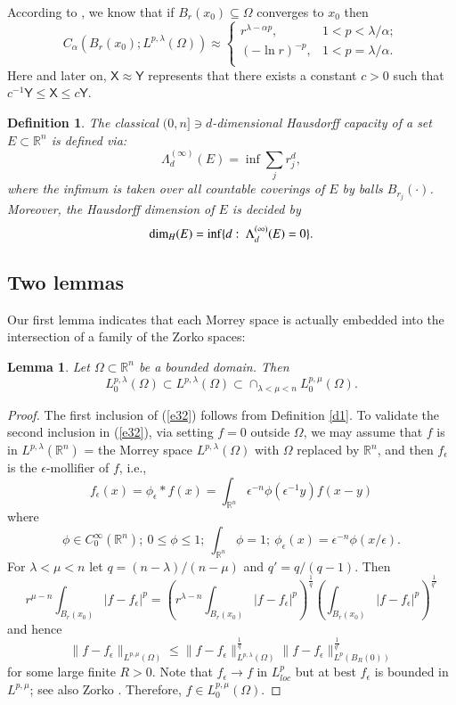 \documentclass[12pt]{amsart}
\newtheorem{definition}[theorem]{Definition}
\newtheorem{lemma}[theorem]{Lemma}
\begin{document}
According to \cite[Theorem 5.3]{AX2004}, we know that if $B_r(x_0)\subseteq\Omega$ converges to $x_0$ then
$$
C_\alpha(B_r(x_0);L^{p,\lambda}(\Omega))\approx\begin{cases}
                              r^{\lambda-\alpha p},  &   1<p<\lambda/\alpha; \\
                              (-\ln r)^{-p},  &   1<p=\lambda/\alpha. \\
                          \end{cases}
$$
Here and later on, ${\mathsf X}\approx{\mathsf Y}$ represents that there exists a constant
$c>0$ such that $c^{-1}{\mathsf Y}\le{\mathsf X}\le c{\mathsf Y}$.

\begin{definition}\label{d3} The classical $(0,n]\ni d$-dimensional Hausdorff capacity of a set $E\subset\mathbb R^n$ is defined via:
$$
\Lambda_d^{(\infty)}(E)=\inf\sum_j r_j^d,
$$
where the infimum is taken over all countable coverings of $E$ by balls $B_{r_j}(\cdot)$. Moreover, the
Hausdorff dimension of $E$ is decided by
$$
\hbox{dim}_H(E)=\inf\{d:\ \Lambda_d^{(\infty)}(E)=0\}.
$$
\end{definition}

\subsection{Two lemmas} Our first lemma indicates that each Morrey space is actually
embedded into the intersection of a family of the Zorko spaces:
\begin{lemma}\label{l1} Let $\Omega\subset\mathbb R^n$ be a bounded domain. Then
\begin{equation}\label{e32}
L^{p,\lambda}_0(\Omega)\subset L^{p,\lambda}(\Omega)\subset\cap_{\lambda<\mu<
n}L^{p,\mu}_0(\Omega).
\end{equation}
\end{lemma}
\begin{proof} The first inclusion of (\ref{e32}) follows from Definition \ref{d1}. To validate the second inclusion in (\ref{e32}), via setting $f=0$ outside $\Omega$, we may assume that $f$ is in $L^{p,\lambda}(\mathbb R^n)$ = the Morrey space $L^{p,\lambda}(\Omega)$ with $\Omega$ replaced by $\mathbb R^n$, and then $f_\epsilon$ is the $\epsilon$-mollifier of $f$, i.e.,
$$
f_\epsilon(x)=\phi_\epsilon\ast f(x)=\int_{\mathbb R^n}\epsilon^{-n}\phi(\epsilon^{-1}y)f(x-y)
$$
where
$$
\phi\in C^\infty_0(\mathbb R^n);\ 0\le\phi\le 1;\ \int_{\mathbb R^n}\phi=1;\ \phi_\epsilon(x)=\epsilon^{-n}\phi(x/\epsilon).
$$
For $\lambda<\mu<n$ let $q=(n-\lambda)/(n-\mu)$ and $q'=q/(q-1)$. Then
$$
r^{\mu-n}\int_{B_r(x_0)}|f-f_\epsilon|^p=\left(r^{\lambda-n}\int_{B_r(x_0)}|f-f_\epsilon|^p\right)^\frac1q\left(\int_{B_r(x_0)}|f-f_\epsilon|^p\right)^\frac{1}{q'}
$$
and hence
$$
\|f-f_\epsilon\|_{L^{p,\mu}(\Omega)}\le\|f-f_\epsilon\|_{L^{p,\lambda}(\Omega)}^\frac1q\|f-f_\epsilon\|_{L^{p}(B_R(0))}^\frac1{q'}
$$
for some large finite $R>0$. Note that $f_\epsilon\to f$ in
$L^p_{loc}$ but at best $f_\epsilon$ is bounded in
$L^{p,\mu}$; see also Zorko \cite{Z1986}. Therefore, $f\in
L^{p,\mu}_0(\Omega)$.
\end{proof}
\end{document}
